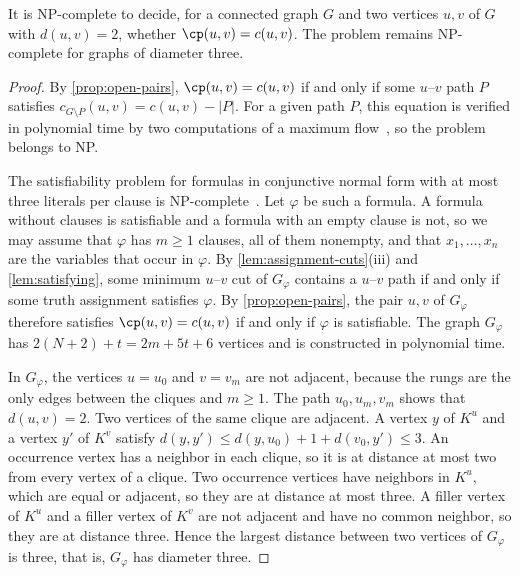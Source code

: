 \begin{theorem}
\label{thm:hardness-distance-two}
It is NP-complete to decide, for a connected graph $G$ and two vertices $u, v$ of $G$ with $d(u, v) = 2$, whether $\cp(u, v) = c(u, v)$.
The problem remains NP-complete for graphs of diameter three.
\end{theorem}

\begin{proof}
By \cref{prop:open-pairs}, $\cp(u, v) = c(u, v)$ if and only if some $u$--$v$ path $P$ satisfies $c_{G \setminus P}(u, v) = c(u, v) - |P|$.
For a given path $P$, this equation is verified in polynomial time by two computations of a maximum flow~\cite[Sections~10.3 and~10.4]{Erickson2019Algorithms}, so the problem belongs to NP.

The satisfiability problem for formulas in conjunctive normal form with at most three literals per clause is NP-complete~\cite{Cook1971Complexity,Karp1972Reducibility}.
Let $\varphi$ be such a formula.
A formula without clauses is satisfiable and a formula with an empty clause is not, so we may assume that $\varphi$ has $m \geq 1$ clauses, all of them nonempty, and that $x_1, \dots, x_n$ are the variables that occur in $\varphi$.
By \cref{lem:assignment-cuts}(iii) and \cref{lem:satisfying}, some minimum $u$--$v$ cut of $G_\varphi$ contains a $u$--$v$ path if and only if some truth assignment satisfies $\varphi$.
By \cref{prop:open-pairs}, the pair $u, v$ of $G_\varphi$ therefore satisfies $\cp(u, v) = c(u, v)$ if and only if $\varphi$ is satisfiable.
The graph $G_\varphi$ has $2(N + 2) + t = 2m + 5t + 6$ vertices and is constructed in polynomial time.

In $G_\varphi$, the vertices $u = u_0$ and $v = v_m$ are not adjacent, because the rungs are the only edges between the cliques and $m \geq 1$.
The path $u_0, u_m, v_m$ shows that $d(u, v) = 2$.
Two vertices of the same clique are adjacent.
A vertex $y$ of $K^u$ and a vertex $y'$ of $K^v$ satisfy $d(y, y') \leq d(y, u_0) + 1 + d(v_0, y') \leq 3$.
An occurrence vertex has a neighbor in each clique, so it is at distance at most two from every vertex of a clique.
Two occurrence vertices have neighbors in $K^u$, which are equal or adjacent, so they are at distance at most three.
A filler vertex of $K^u$ and a filler vertex of $K^v$ are not adjacent and have no common neighbor, so they are at distance three.
Hence the largest distance between two vertices of $G_\varphi$ is three, that is, $G_\varphi$ has diameter three.
\end{proof}

